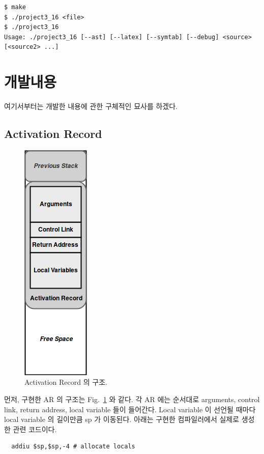 \documentclass[a4paper,12p]{paper}
\begin{document}
\begin{verbatim}
$ make
$ ./project3_16 <file>
$ ./project3_16
Usage: ./project3_16 [--ast] [--latex] [--symtab] [--debug] <source> [<source2> ...]
\end{verbatim}

\section{개발내용}
여기서부터는 개발한 내용에 관한 구체적인 묘사를 하겠다.

\subsection{Activation Record}

\begin{figure}[ht]
  \centering
\includegraphics[scale=0.5]{figs/activation_record.png}
\caption{Activation Record 의 구조.}\label{fig:ar}
\end{figure}

먼저, 구현한 AR 의 구조는 Fig.~\ref{fig:ar} 와 같다. 각 AR 에는 순서대로 arguments, control link, return address, local variable 들이 들어간다. Local variable 이 선언될 때마다 local variable 의 길이만큼 sp 가 이동된다. 아래는 구현한 컴파일러에서 실제로 생성한 관련 코드이다.

\begin{verbatim}
  addiu $sp,$sp,-4 # allocate locals
\end{verbatim}
\end{document}
